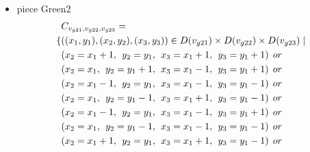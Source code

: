 \begin{appendices}
\begin{itemize}
\begin{align*}
\end{align*}
 \item piece Green2\\
 \begin{align*}
&\Con{g21}{g22}{g23}=
\\\{&((x_{1},y_{1}),(x_{2},y_{2}),(x_{3},y_{3}))\in \Domain{g21}\times \Domain{g22}\times\Domain{g23}\mid\\
&(x_{2} = x_{1}+1,\hspace{1ex}y_{2} = y_{1},\hspace{1ex}x_{3} = x_{1}+1, \hspace{1ex}y_{3} = y_{1}+1)\hspace{1ex} or\\
&(x_{2} = x_{1},\hspace{1ex}y_{2} = y_{1}+1,\hspace{1ex}x_{3} = x_{1}-1, \hspace{1ex}y_{3} = y_{1}+1)\hspace{1ex} or\\
&(x_{2} = x_{1}-1,\hspace{1ex}y_{2} = y_{1},\hspace{1ex}x_{3} = x_{1}-1,\hspace{1ex} y_{3} = y_{1}-1)\hspace{1ex} or\\
&(x_{2} = x_{1},\hspace{1ex}y_{2} = y_{1}-1,\hspace{1ex}x_{3} = x_{1}+1, \hspace{1ex}y_{3} = y_{1}-1)\hspace{1ex} or\\
&(x_{2} = x_{1}-1,\hspace{1ex}y_{2} = y_{1},\hspace{1ex}x_{3} = x_{1}-1, \hspace{1ex}y_{3} = y_{1}+1)\hspace{1ex} or\\
&(x_{2} = x_{1},\hspace{1ex}y_{2} = y_{1}-1,\hspace{1ex}x_{3} = x_{1}-1, \hspace{1ex}y_{3} = y_{1}-1)\hspace{1ex} or\\
&(x_{2} = x_{1}+1,\hspace{1ex}y_{2} = y_{1},\hspace{1ex}x_{3} = x_{1}+1, \hspace{1ex}y_{3} = y_{1}-1)\hspace{1ex} or\\

\end{align*}
\end{itemize}
\end{appendices}
